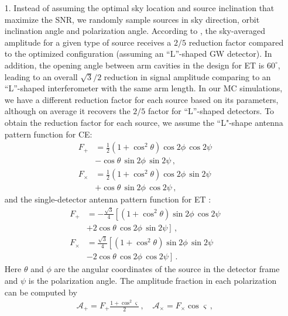 \documentclass[prd,aps,floatfix,superscriptaddress,nofootinbib,twocolumn,10pt,English]{revtex4-1}
\begin{document}
\begin{itemize}

\item[1.] Instead of assuming the optimal sky location and source inclination that
maximize the SNR, we randomly sample sources in sky direction, orbit
inclination angle and polarization angle. According to
\cite{sathyaprakash2009physics,regimbau2012mock}, the sky-averaged
amplitude for a given type of source receives a $2/5$ reduction
factor compared to the optimized configuration (assuming an
``L''-shaped GW detector). In addition, the opening angle between arm
cavities in the design for ET is $60^\circ$, leading
to an overall $\sqrt{3}/2$ reduction in signal amplitude comparing to
an ``L''-shaped interferometer with the same arm length.  In our
MC simulations, we have a different reduction factor for each
source based on its parameters, although on average it recovers the
$2/5$ factor for ``L''-shaped detectors. To obtain the reduction
factor for each source, we assume the ``L"-shape antenna pattern
function \cite{sathyaprakash2009physics} for CE:
%
\begin{align}
F_+ &= \frac{1}{2} (1+\cos^2\theta) \cos 2\phi\, \cos 2 \psi \nonumber \\
& -\cos \theta\, \sin 2\phi\,\sin 2\psi \,, \\
F_\times &= \frac{1}{2} (1+\cos^2\theta) \cos 2\phi\, \sin 2 \psi \nonumber \\
&+\cos \theta\, \sin 2\phi\,\cos 2\psi\,,
\end{align} 
%
and the single-detector antenna pattern function for ET \cite{regimbau2012mock}:
%
\begin{align}
 F_+ & = -\frac{\sqrt{3}}{4} \left [ (1+\cos^2\theta) \sin 2\phi\, \cos 2 \psi \right. \nonumber \\
 & \left. +2\cos \theta\, \cos 2\phi\,\sin 2\psi \right ] \,, \\
 F_\times & = \frac{\sqrt{3}}{4} \left [ (1+\cos^2\theta) \sin 2\phi\, \sin 2 \psi \right. \nonumber \\
 & \left.  -2\cos \theta\, \cos 2\phi\,\cos 2\psi \right ]\,.
\end{align} 
%
Here $\theta$ and $\phi$ are the angular coordinates of the source in the
detector frame and $\psi$ is the polarization angle. The amplitude
fraction in each polarization can be computed by
%
\begin{align}
\label{eq:ApAc}
\mathcal A_+ = F_+ \frac{1+\cos^2\varsigma}{2}\,,\quad \mathcal A_\times = F_\times \cos \varsigma\,,
\end{align}

\end{itemize}
\end{document}
